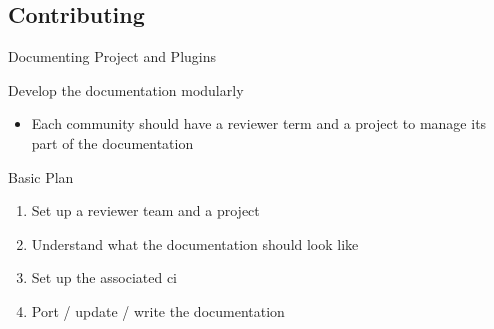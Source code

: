 \documentclass[10pt]{beamer}
\begin{document}
\subsection{Contributing}


\begin{frame}{Documenting Project and Plugins}
  \begin{tcbProp}{Develop the documentation modularly}
    \begin{itemize}
      \item Each community should have a reviewer term and a project to manage
            its part of the documentation
    \end{itemize}
  \end{tcbProp}
  \begin{tcbProp}{Basic Plan}
    \begin{enumerate}
      \item Set up a reviewer team and a project
      \item Understand what the documentation should look like
      \item Set up the associated ci
      \item Port / update / write the documentation
    \end{enumerate}
  \end{tcbProp}
\end{frame}
\end{document}

